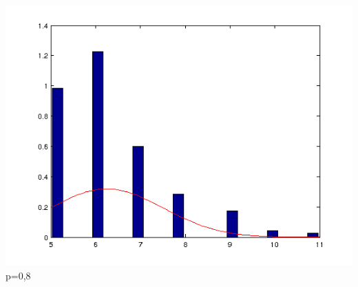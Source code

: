 \documentclass{article}
\begin{document}
\begin{center}
	\includegraphics[scale=0.5]{graph/n5p8.png} \\
	p=0,8
\end{center}
\end{document}
